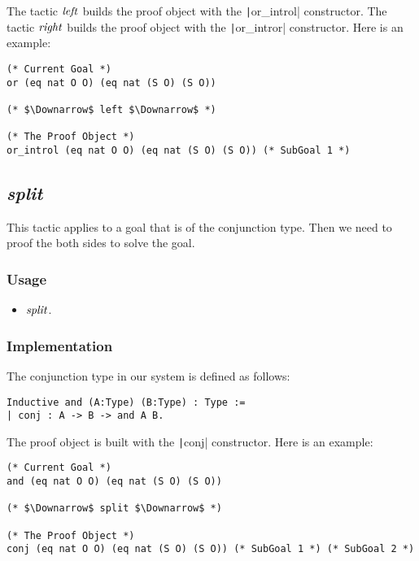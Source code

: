 The tactic ${\it left}$ builds the proof object with the \texttt|or_introl| constructor.
The tactic ${\it right}$ builds the proof object with the \texttt|or_intror| constructor.
Here is an example:
\begin{center}
\begin{minipage}{\textwidth}
\begin{verbatim}
(* Current Goal *)
or (eq nat O O) (eq nat (S O) (S O))

(* $\Downarrow$ left $\Downarrow$ *)

(* The Proof Object *)
or_introl (eq nat O O) (eq nat (S O) (S O)) (* SubGoal 1 *)
\end{verbatim}
\end{minipage}
\end{center}

\subsection{\it split}
This tactic applies to a goal that is of the conjunction type. Then we need to proof the both sides to solve the goal.

\subsubsection*{Usage}
\begin{itemize}
\item ${\it split}$.
\end{itemize}

\subsubsection*{Implementation}
The conjunction type in our system is defined as follows:
\begin{center}
\begin{minipage}{0.6\textwidth}
\begin{verbatim}
Inductive and (A:Type) (B:Type) : Type :=
| conj : A -> B -> and A B.   
\end{verbatim}
\end{minipage}
\end{center}

The proof object is built with the \texttt|conj| constructor.
Here is an example:
\begin{center}
\begin{minipage}{\textwidth}
\begin{verbatim}
(* Current Goal *)
and (eq nat O O) (eq nat (S O) (S O))

(* $\Downarrow$ split $\Downarrow$ *)

(* The Proof Object *)
conj (eq nat O O) (eq nat (S O) (S O)) (* SubGoal 1 *) (* SubGoal 2 *)
\end{verbatim}
\end{minipage}
\end{center}


